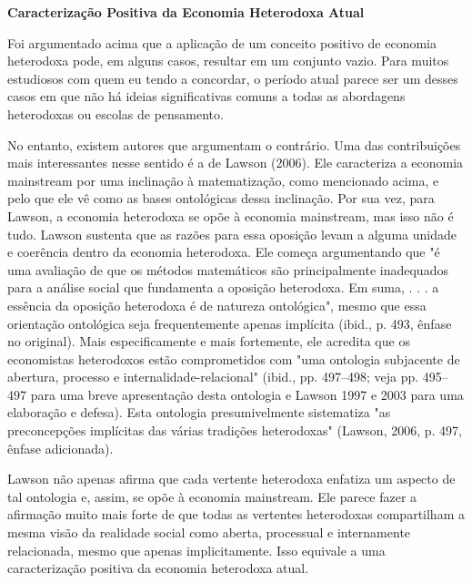 \documentclass[a4paper,12pt]{article}[abntex2]
\begin{document}
\textbf{Caracterização Positiva da Economia Heterodoxa Atual}

Foi argumentado acima que a aplicação de um conceito positivo de economia heterodoxa pode, em alguns casos, resultar em um conjunto vazio. Para muitos estudiosos com quem eu tendo a concordar, o período atual parece ser um desses casos em que não há ideias significativas comuns a todas as abordagens heterodoxas ou escolas de pensamento.

No entanto, existem autores que argumentam o contrário. Uma das contribuições mais interessantes nesse sentido é a de Lawson (2006). Ele caracteriza a economia mainstream por uma inclinação à matematização, como mencionado acima, e pelo que ele vê como as bases ontológicas dessa inclinação. Por sua vez, para Lawson, a economia heterodoxa se opõe à economia mainstream, mas isso não é tudo. Lawson sustenta que as razões para essa oposição levam a alguma unidade e coerência dentro da economia heterodoxa. Ele começa argumentando que "é uma avaliação de que os métodos matemáticos são principalmente inadequados para a análise social que fundamenta a oposição heterodoxa. Em suma, . . . a essência da oposição heterodoxa é de natureza ontológica", mesmo que essa orientação ontológica seja frequentemente apenas implícita (ibid., p. 493, ênfase no original). Mais especificamente e mais fortemente, ele acredita que os economistas heterodoxos estão comprometidos com "uma ontologia subjacente de abertura, processo e internalidade-relacional" (ibid., pp. 497–498; veja pp. 495–497 para uma breve apresentação desta ontologia e Lawson 1997 e 2003 para uma elaboração e defesa). Esta ontologia presumivelmente sistematiza "as preconcepções implícitas das várias tradições heterodoxas" (Lawson, 2006, p. 497, ênfase adicionada).

Lawson não apenas afirma que cada vertente heterodoxa enfatiza um aspecto de tal ontologia e, assim, se opõe à economia mainstream. Ele parece fazer a afirmação muito mais forte de que todas as vertentes heterodoxas compartilham a mesma visão da realidade social como aberta, processual e internamente relacionada, mesmo que apenas implicitamente. Isso equivale a uma caracterização positiva da economia heterodoxa atual.
\end{document}
